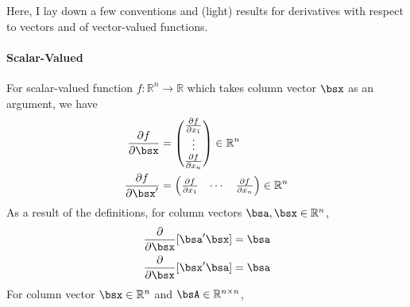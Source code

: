 \documentclass[12pt]{article}
\theoremstyle{plain}
\theoremstyle{definition}
\theoremstyle{remark}
\newcommand{\Rn}{\mathbb{R}^n}
\newcommand{\Rnn}{\mathbb{R}^{n\times n}}
\begin{document}
Here, I lay down a few conventions and (light) results for derivatives
with respect to vectors and of vector-valued functions.

\paragraph{Scalar-Valued}
For scalar-valued function $f: \mathbb{R}^n \rightarrow \mathbb{R}$
which takes column vector $\bsx$ as an argument, we have
\begin{align*}
  \frac{\partial f}{\partial \bsx}
  &=
  \begin{pmatrix}
    \frac{\partial f}{\partial x_1} \\
    \vdots\\
    \frac{\partial f}{\partial x_n} \\
    \end{pmatrix} \in \mathbb{R}^n\\
  \frac{\partial f}{\partial \bsx'}
  &=
  \begin{pmatrix}
    \frac{\partial f}{\partial x_1} &
    \cdots&
    \frac{\partial f}{\partial x_n}
  \end{pmatrix}\in \mathbb{R}^n
\end{align*}
As a result of the definitions, for column vectors $\bsa,\bsx\in \Rn$,
\begin{align*}
  \frac{\partial}{\partial \bsx}
  [\bsa'\bsx]
  &= \bsa \\
  \frac{\partial}{\partial \bsx}
  [\bsx'\bsa]
  &= \bsa
\end{align*}
For column vector $\bsx\in \Rn$ and $\bsA\in\Rnn$,
\end{document}

